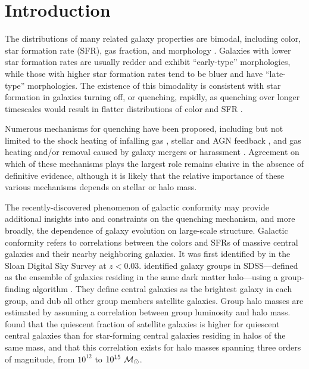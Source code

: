 
\section{Introduction}\label{sec:intro}

The distributions of many related galaxy properties are bimodal, including color, star formation rate (SFR), gas fraction, and morphology
\citep[e.g.,][]{Strateva01, Kauffmann03, Baldry04, Balogh04b}.
Galaxies with lower star formation rates are usually redder and exhibit ``early-type'' morphologies, while those with higher star formation rates tend to be bluer and have ``late-type'' morphologies.
The existence of this bimodality is consistent with star formation in galaxies turning off, or quenching, rapidly, as quenching over longer timescales would result in flatter distributions of color and SFR \citep[e.g.,][]{TinkerWetzel10, Wetzel13}.

Numerous mechanisms for quenching have been proposed, including but not limited to the shock heating of infalling gas \citep*[e.g.,][]{WhiteRees78, DekelBirnboim06},
stellar and AGN feedback \citep[e.g.,][]{Croton06, Hopkins06}, and
gas heating and/or removal caused by galaxy mergers or harassment \citep[e.g.,][]{Moore96}.
Agreement on which of these mechanisms plays the largest role remains elusive in the absence of definitive evidence, although it is likely that the relative importance of these various mechanisms depends on stellar or halo mass.

The recently-discovered phenomenon of galactic conformity may provide additional insights into and constraints on the quenching mechanism, and more broadly, the dependence of galaxy evolution on large-scale structure.
Galactic conformity refers to correlations between the colors and SFRs of massive central galaxies and their nearby neighboring galaxies.
It was first identified by \citet{Weinmann06} in the Sloan Digital Sky Survey \citep[SDSS;][]{York00} at $z<0.03$.
\citet{Weinmann06} identified galaxy groups in SDSS---defined as the ensemble of galaxies residing in the same dark matter halo---using a group-finding algorithm \citep{Yang05a}.
They define central galaxies as the brightest galaxy in each group, and dub all other group members satellite galaxies.
Group halo masses are estimated by assuming a correlation between group luminosity and halo mass.
\citet{Weinmann06} found that the quiescent fraction of satellite galaxies is higher for quiescent central galaxies than for star-forming central galaxies residing in halos of the same mass, and that this correlation exists for halo masses spanning three orders of magnitude, from $10^{12}$ to $10^{15}~\msun$.

